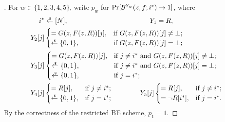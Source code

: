 \begin{proof}[]
For ${w\in\{1,2,3,4,5\}}$,
write $p_w$ for ${\Pr[{\mathcal{B}}^{Y_w}(z,f;i^\ast)\to 1]}$, where
\begin{align*}
i^\ast&{}\draws[N],
\qquad\qquad\qquad\qquad\qquad\qquad
Y_1=R,\\
Y_2[j]&\begin{cases}
=G(z,F(z,R))[j],&\textup{if }G(z,F(z,R))[j]\neq\bot;\\
\draws\bit,&\textup{if }G(z,F(z,R))[j]=\bot;
\end{cases}\\
Y_3[j]&\begin{cases}
=G(z,F(z,R))[j],&\textup{if }j\neq i^\ast\textup{ and }G(z,F(z,R))[j]\neq\bot;\\
\draws\bit,&\textup{if }j\neq i^\ast\textup{ and }G(z,F(z,R))[j]=\bot;\\
\draws\bit,&\textup{if }j=i^\ast;
\end{cases}\\
Y_4[j]&\begin{cases}
=R[j],&\textup{if }j\neq i^\ast;\\
\draws\bit,&\textup{if }j=i^\ast;
\end{cases}
\qquad\qquad
Y_5[j]\begin{cases}
=R[j],&\textup{if }j\neq i^\ast;\\
=\neg R[i^\ast],&\textup{if }j=i^\ast.
\end{cases}
\end{align*}
By the correctness of the restricted BE scheme,
${p_1=1}$.


\end{proof}
